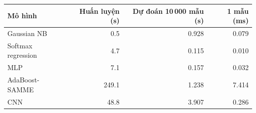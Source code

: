 \begin{tabular}{lrrr}
\toprule
Mô hình & Huấn luyện (s) & Dự đoán 10\,000 mẫu (s) & 1 mẫu (ms) \\
\midrule
Gaussian NB & 0.5 & 0.928 & 0.079 \\
Softmax regression & 4.7 & 0.115 & 0.010 \\
MLP & 7.1 & 0.157 & 0.032 \\
AdaBoost-SAMME & 249.1 & 1.238 & 7.414 \\
CNN & 48.8 & 3.907 & 0.286 \\
\bottomrule
\end{tabular}

